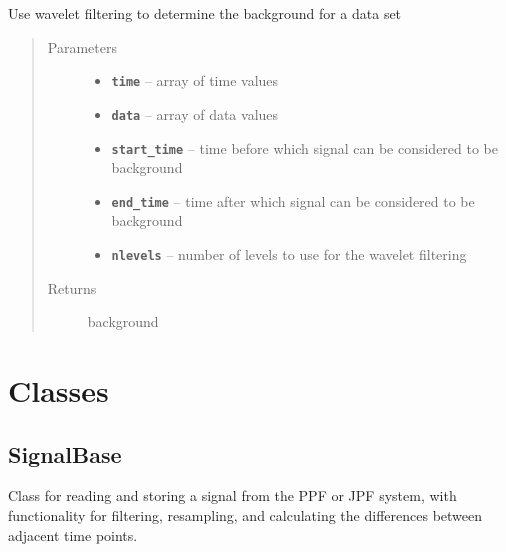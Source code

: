 \documentclass[letterpaper,10pt,english]{sphinxmanual}
\begin{document}
\begin{fulllineitems}
\label{wv_get_background:wv_get_background.wv_get_background}
Use wavelet filtering to determine the background for a data set
\begin{quote}\begin{description}
\item[{Parameters}] \leavevmode\begin{itemize}
\item {} 
\textbf{\texttt{time}} -- array of time values

\item {} 
\textbf{\texttt{data}} -- array of data values

\item {} 
\textbf{\texttt{start\_time}} -- time before which signal can be considered to be background

\item {} 
\textbf{\texttt{end\_time}} -- time after which signal can be considered to be background

\item {} 
\textbf{\texttt{nlevels}} -- number of levels to use for the wavelet filtering

\end{itemize}

\item[{Returns}] \leavevmode
background

\end{description}\end{quote}

\end{fulllineitems}



\chapter{Classes}
\label{classes:classes}\label{classes::doc}

\section{SignalBase}
\label{signal_base:module-signal_base}\label{signal_base:signalbase}\label{signal_base::doc}
Class for reading and storing a signal from the PPF or JPF system, 
with functionality for filtering, resampling, and calculating the 
differences between adjacent time points.
\end{document}
